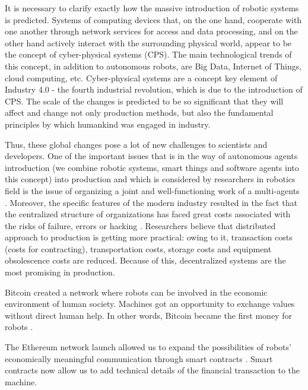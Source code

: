 \documentclass{article}
\begin{document}
It is necessary to clarify exactly how the massive introduction of robotic systems is predicted. Systems of computing devices that, on the one hand, cooperate with one another through network services for access and data processing, and on the other hand actively interact with the surrounding physical world, appear to be the concept of cyber-physical systems (CPS)\cite{Kang2016SmartDirections}. The main technological trends of this concept, in addition to autonomous robots, are Big Data, Internet of Things, cloud computing, etc. Cyber-physical systems are a concept key element of Industry 4.0 \cite{Jazdi2014Cyber4.0} - the fourth industrial revolution, which is due to the introduction of CPS. The scale of the changes is predicted to be so significant that they will affect and change \cite{MonostoriLaszlo2014Cyber-physicalChallenges} not only production methods, but also the fundamental principles by which humankind was engaged in industry.

Thus, these global changes pose a lot of new challenges to scientists and developers. One of the important issues \cite{Leitao2015IndustrialIndustry} that is in the way of autonomous agents introduction (we combine robotic systems, smart things and software agents into this concept) into production and which is considered \cite{Zhu2014RobustSystems} by researchers in robotics field is the issue of organizing a joint and well-functioning work of a multi-agents \cite{Liu2013Multi-robotConstraints}. Moreover, the specific \cite{Lasi2014Industry4.0} features of the modern industry resulted in the fact that the centralized structure of organizations has faced great costs associated with the risks of failure, errors or hacking \cite{Khajavi2014AdditiveChain}. Researchers believe that distributed approach to production is getting more practical: owing to it, transaction costs (costs for contracting), transportation costs, storage costs and equipment obsolescence costs are reduced. Because of this, decentralized systems are the most promising in production\cite{DeGennaro2006DecentralizedSystems}.

Bitcoin created a network where robots can be involved in the economic environment of human society. Machines got an opportunity to exchange values without direct human help. In other words, Bitcoin became the first money for robots \cite{Kelion2015CouldThemselves}.

The Ethereum network launch allowed us to expand the possibilities of robots’ economically meaningful communication through smart contracts \cite{Buterin2014EthereumPlatform}. Smart contracts now allow us to add technical details of the financial transaction to the machine.
\end{document}
